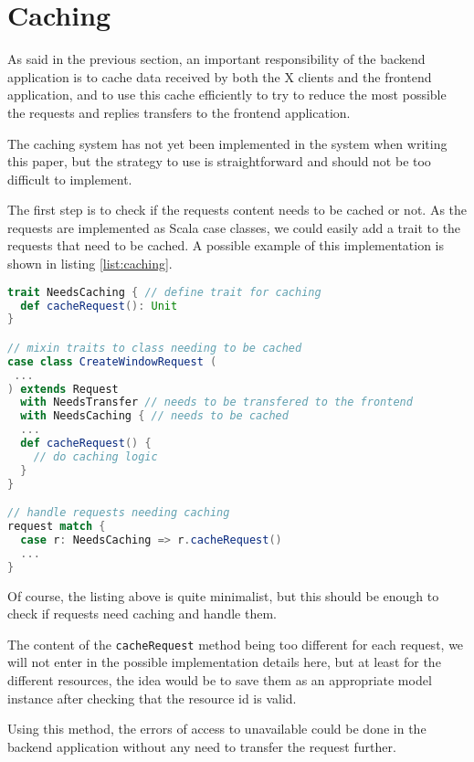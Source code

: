 \section{Caching}
%
As said in the previous section, an important responsibility of the backend application is to
cache data received by both the X clients and the frontend application, and to use this cache 
efficiently to try to reduce the most possible the requests and replies transfers to the 
frontend application.

The caching system has not yet been implemented in the system when writing this paper, but the 
strategy to use is straightforward and should not be too difficult to implement.

The first step is to check if the requests content needs to be cached or not. 
As the requests are implemented as Scala case classes, we could easily add a trait 
to the requests that need to be cached. A possible example of this implementation is shown 
in listing \ref{list:caching}.

\begin{lstlisting}[basicstyle=\footnotesize,caption=Possible implementation of requests needing cache,language=scala,label=list:caching]
trait NeedsCaching { // define trait for caching
  def cacheRequest(): Unit
}

// mixin traits to class needing to be cached
case class CreateWindowRequest (
 ...
) extends Request 
  with NeedsTransfer // needs to be transfered to the frontend
  with NeedsCaching { // needs to be cached 
  ...
  def cacheRequest() {
    // do caching logic
  }
}

// handle requests needing caching
request match {
  case r: NeedsCaching => r.cacheRequest()
  ...
}
\end{lstlisting}
Of course, the listing above is quite minimalist, but this should be enough to check if requests need 
caching and handle them. 

The content of the \lstinline{cacheRequest} method being too different 
for each request, we will not enter in the possible implementation details here, but at least 
for the different resources, the idea would be to save them as an appropriate model instance 
after checking that the resource id is valid.

Using this method, the errors of access to unavailable could be done in the backend application 
without any need to transfer the request further.
